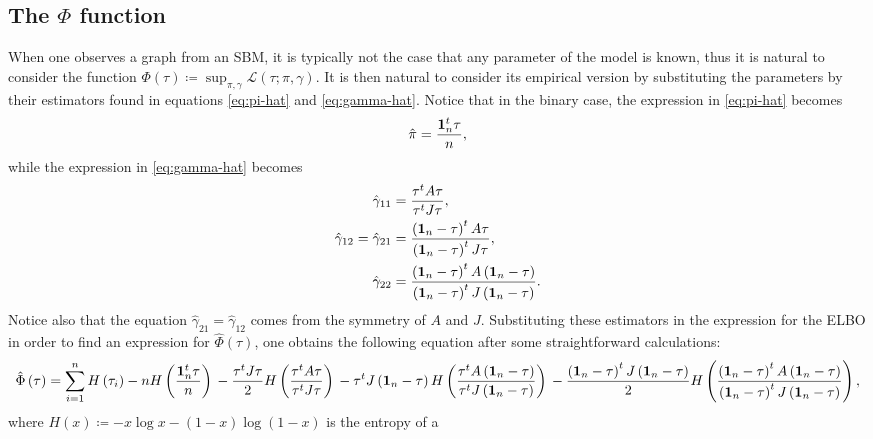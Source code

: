 \documentclass[../../main.tex]{subfiles} %
\begin{document}
\subsection{The \(\Phi\) function}
When one observes a graph from an SBM, it is typically not the case that any 
parameter of the model is known, thus it is natural to consider the function 
\(\Phi (\tau) \coloneqq \sup_{\pi, \gamma} \mathcal L (\tau; \pi, \gamma)\). It 
is then natural to consider its empirical version by substituting the 
parameters by their estimators found in equations \ref{eq:pi-hat} and 
\ref{eq:gamma-hat}. Notice that in the binary case, the 
expression in \ref{eq:pi-hat} becomes
\begin{equation}
	\hat \pi = \frac{\mathbf{1}_{n}^t \tau}{n},
	\label{eq:pi-hat-two}
\end{equation}
while the expression in \ref{eq:gamma-hat} becomes
\begin{align}
	\hat \gamma_{11} &= \frac{\tau^t A \tau}{\tau^t J \tau}, \\
	\hat \gamma_{12} = \hat \gamma_{21} &= \frac{\left( \mathbf{1}_{n} - \tau \right)^t 
	A \tau}{\left(
		\mathbf{1}_{n} - \tau \right)^t J \tau}, \\
	\hat \gamma_{22} &= \frac{\left( \mathbf{1}_{n} - \tau \right)^t A \left( \mathbf{1}_{n} -
		\tau
		\right)}{\left( \mathbf{1}_{n} - \tau \right)^t J \left( \mathbf{1}_{n} - \tau \right)}.
\end{align}
Notice also that the equation \(\hat \gamma_{21} = \hat \gamma_{12}\) comes 
from the symmetry of \(A\) and \(J\). Substituting these estimators in the
expression for the ELBO in order to find an expression for \(\hat \Phi (\tau) 
\), one obtains the following equation after some straightforward calculations:
\begin{dmath}
	\hat \Phi \left( \tau \right) = \sum_{i=1}^n H \left( \tau_i \right) - n
	H \left( \frac{\ones^t \tau}{n} \right) \\
	- \frac{\tau^t J \tau}{2} H \left( \frac{\tau^t A \tau}{\tau^t J \tau}
	\right) \\
	- \tau^t J \left( \ones - \tau \right) H \left( \frac{\tau^t A \left(
		\ones - \tau \right)}{\tau^t J \left( \ones - \tau \right)} \right)\\
	- \frac{\left( \ones - \tau \right)^t J \left( \ones - \tau \right)}{2}
	H \left( \frac{\left( \ones - \tau \right)^t A \left( \ones - \tau \right)}
	{\left( \ones - \tau \right)^t J \left( \ones - \tau \right)}\right),
	\label{eq:phi}
\end{dmath}
where \(H(x) \coloneqq -x \log{x} - (1 - x) \log{(1-x)}\) is the entropy of a
\end{document}
